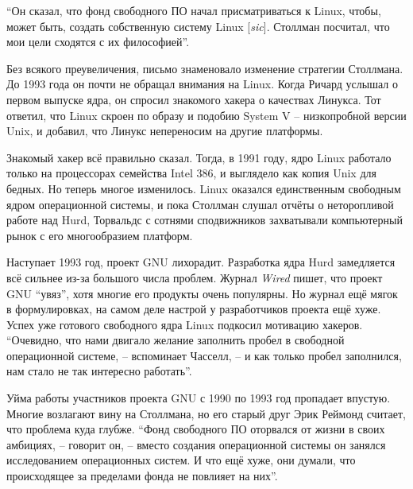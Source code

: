 \enquote{Он сказал, что фонд свободного ПО начал присматриваться к Linux, чтобы, может быть, создать собственную систему Linux [\textit{sic}]. Столлман посчитал, что мои цели сходятся с их философией}.

Без всякого преувеличения, письмо знаменовало изменение стратегии Столлмана. До 1993 года он почти не обращал внимания на Linux. Когда Ричард услышал о первом выпуске ядра, он спросил знакомого хакера о качествах Линукса. Тот ответил, что Linux скроен по образу и подобию System V -- низкопробной версии Unix, и добавил, что Линукс непереносим на другие платформы.

Знакомый хакер всё правильно сказал. Тогда, в 1991 году, ядро Linux работало только на процессорах семейства Intel 386, и выглядело как копия Unix для бедных. Но теперь многое изменилось. Linux оказался единственным свободным ядром операционной системы, и пока Столлман слушал отчёты о неторопливой работе над Hurd, Торвальдс с сотнями сподвижников захватывали компьютерный рынок с его многообразием платформ.

Наступает 1993 год, проект GNU лихорадит. Разработка ядра Hurd замедляется всё сильнее из-за большого числа проблем. Журнал \textit{Wired} пишет, что проект GNU \enquote{увяз}, хотя многие его продукты очень популярны.  Но журнал ещё мягок в формулировках, на самом деле настрой у разработчиков проекта ещё хуже. Успех уже готового свободного ядра Linux подкосил мотивацию хакеров. \enquote{Очевидно, что нами двигало желание заполнить пробел в свободной операционной системе, -- вспоминает Часселл, -- и как только пробел заполнился, нам стало не так интересно работать}. 

Уйма работы участников проекта GNU с 1990 по 1993 год пропадает впустую. Многие возлагают вину на Столлмана, но его старый друг Эрик Реймонд считает, что проблема куда глубже. \enquote{Фонд свободного ПО оторвался от жизни в своих амбициях, -- говорит он, -- вместо создания операционной системы он занялся исследованием операционных систем. И что ещё хуже, они думали, что происходящее за пределами фонда не повлияет на них}.

